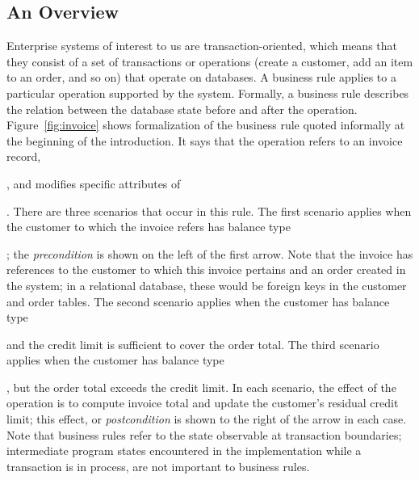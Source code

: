 
\subsection{An Overview}

Enterprise systems of interest to us are transaction-oriented, which means that
they consist of a set of transactions or operations (\eg create a customer, add
an item to an order, and so on) that operate on databases.  A business rule
applies to a particular operation supported by the system.  Formally, a business
rule describes the relation between the database state before and after the
operation.  Figure~\ref{fig:invoice} shows formalization of the business rule
quoted informally at the beginning of the introduction.  It says that the
operation refers to an invoice record, \subject{inv}, and modifies specific
attributes of \subject{inv}.  There are three scenarios that occur in this rule.
The first scenario applies when the customer to which the invoice refers has
balance type \subject{None}; the \textit{precondition} is shown on the left of
the first arrow.  Note that the invoice has references to the customer to which
this invoice pertains and an order created in the system; in a relational
database, these would be foreign keys in the customer and order tables.  The
second scenario applies when the customer has balance type \subject{Credit} and
the credit limit is sufficient to cover the order total.  The third scenario
applies when the customer has balance type \subject{Credit}, but the order total
exceeds the credit limit.  In each scenario, the effect of the operation is to
compute invoice total and update the customer's residual credit limit; this
effect, or \textit{postcondition} is shown to the right of the arrow in each
case.  Note that business rules refer to the state observable at transaction
boundaries; intermediate program states encountered in the implementation while
a transaction is in process, are not important to business rules.

